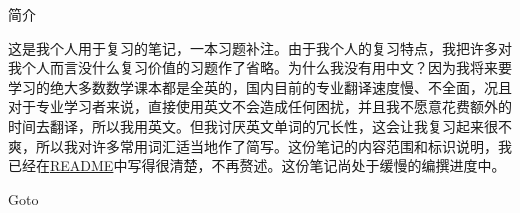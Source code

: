 \documentclass[a4paper, 11pt, UTF8]{article}
\begin{document}
\begin{large}
\newcommand{\AlignEq}[2]{
\vspace{-25pt}
\begin{align*}
	#1#2
\end{align*}
\vspace{-25pt}
}

\newcommand{\ChDecl}[3]{{\huge\tgbfxx\hypertarget{#1}{#2}}{#3}{\vspace{5pt}}}
\newcommand\hLk[2]{\hyperlink{#1}{#2}}
\newcommand\Lch[2]{\hLk{Ch#1}{#2}}
\newcommand\TXT[1]{\textup{#1}}

\def\nLineDB{\vspace{-18pt}\par}   %
\newcommand{\orMode}[2]{#1#2} %

\orMode{\centerline{\Large 简介}\vspace{4pt}\par
{\normalsize 这是我个人用于复习的笔记，一本习题补注。由于我个人的复习特点，我把许多对我个人而言没什么复习价值的习题作了省略。为什么我没有用中文？因为我将来要学习的绝大多数数学课本都是全英的，国内目前的专业翻译速度慢、不全面，况且对于专业学习者来说，直接使用英文不会造成任何困扰，并且我不愿意花费额外的时间去翻译，所以我用英文。但我讨厌英文单词的冗长性，这会让我复习起来很不爽，所以我对许多常用词汇适当地作了简写。这份笔记的内容范围和标识说明，我已经在\href{run:./README}{README}中写得很清楚，不再赘述。这份笔记尚处于缓慢的编撰进度中。}\par


\begin{center}

Goto\vspace{8pt}\par


\end{center}}
\end{large}
\end{document}
